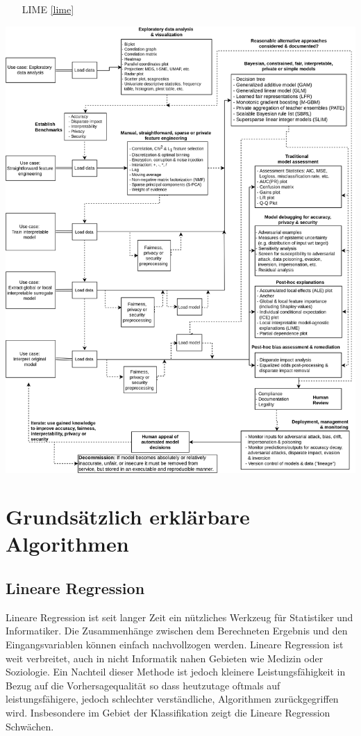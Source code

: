 \documentclass[
  12pt, %
  a4paper, %
  oneside, %
  openany, 
  numbers=noenddot, %
  BCOR=5mm, %
  parskip=half*, %
  thesis, %
]{bfhbook}
\begin{document}
\begin{itemize}
	\item[LIME] \ref{lime}
\end{itemize}

\includegraphics[width=\textwidth]{Bilder/blueprint.png}

\section{Grundsätzlich erklärbare Algorithmen}
\subsection{Lineare Regression}
Lineare Regression ist seit langer Zeit ein nützliches Werkzeug für Statistiker und Informatiker. Die Zusammenhänge zwischen dem Berechneten Ergebnis und den Eingangsvariablen können einfach nachvollzogen werden. Lineare Regression ist weit verbreitet, auch in nicht Informatik nahen Gebieten wie Medizin oder Soziologie. Ein Nachteil dieser Methode ist jedoch kleinere Leistungsfähigkeit in Bezug auf die Vorhersagequalität so dass heutzutage oftmals auf leistungsfähigere, jedoch schlechter verständliche, Algorithmen zurückgegriffen wird. Insbesondere im Gebiet der Klassifikation zeigt die Lineare Regression Schwächen.
\end{document}
